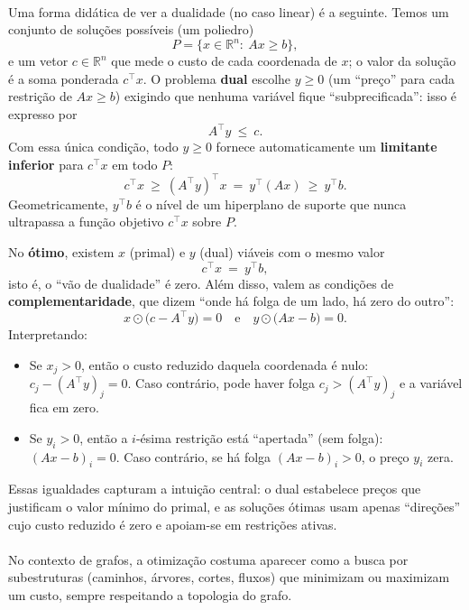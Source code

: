 \documentclass[12pt,a4paper]{article}
\def\emph#1{#1}%
\begin{document}
\paragraph{}
Uma forma didática de ver a dualidade (no caso linear) é a seguinte. Temos um conjunto de soluções possíveis (um poliedro)
\[P=\{x\in\mathbb{R}^n:\ Ax\ge b\},\]
e um vetor \(c\in\mathbb{R}^n\) que mede o \emph{custo} de cada coordenada de \(x\); o valor da solução é a soma ponderada \(c^\top x\). O problema \textbf{dual} escolhe \(y\ge 0\) (um “preço” para cada restrição de \(Ax\ge b\)) exigindo que nenhuma variável fique “subprecificada”: isso é expresso por
\[A^\top y\ \le\ c.\]
Com essa única condição, todo \(y\ge 0\) fornece automaticamente um \textbf{limitante inferior} para \(c^\top x\) em todo \(P\):
\[c^\top x\ \ge\ (A^\top y)^\top x\ =\ y^\top(Ax)\ \ge\ y^\top b.\]
Geometricamente, \(y^\top b\) é o nível de um \emph{hiperplano de suporte} que nunca ultrapassa a função objetivo \(c^\top x\) sobre \(P\).

No \textbf{ótimo}, existem \(x\) (primal) e \(y\) (dual) viáveis com o \emph{mesmo} valor
\[c^\top x\ =\ y^\top b,\]
isto é, o “vão de dualidade” é zero. Além disso, valem as condições de \textbf{complementaridade}, que dizem “onde há folga de um lado, há zero do outro”:
\[x\odot\big(c-A^\top y\big)=0\quad\text{e}\quad y\odot\big(Ax-b\big)=0.
\]
Interpretando:
\begin{itemize}
    \item Se \(x_j>0\), então o \emph{custo reduzido} daquela coordenada é nulo: \(c_j-(A^\top y)_j=0\). Caso contrário, pode haver folga \(c_j>(A^\top y)_j\) e a variável fica em zero.
    \item Se \(y_i>0\), então a \(i\)-ésima restrição está “apertada” (sem folga): \((Ax-b)_i=0\). Caso contrário, se há folga \((Ax-b)_i>0\), o preço \(y_i\) zera.
\end{itemize}
Essas igualdades capturam a intuição central: o dual estabelece preços que justificam o valor mínimo do primal, e as soluções ótimas usam apenas “direções” cujo custo reduzido é zero e apoiam-se em restrições ativas.

\paragraph{}
No contexto de grafos, a otimização costuma aparecer como a busca por subestruturas (caminhos, árvores, cortes, fluxos) que minimizam ou maximizam um custo, sempre respeitando a topologia do grafo.
\end{document}
